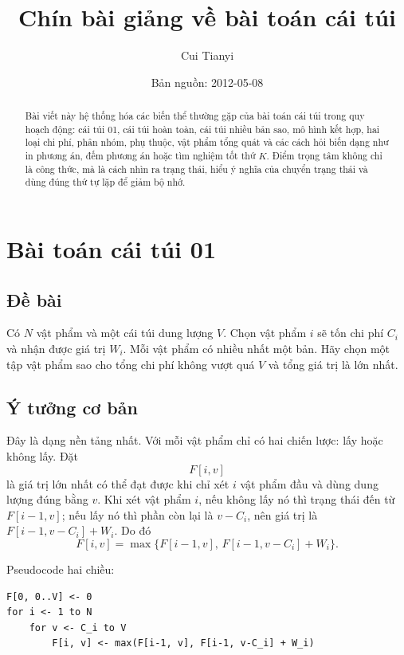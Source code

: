 \documentclass[11pt]{article}
\title{Chín bài giảng về bài toán cái túi}
\author{Cui Tianyi}
\date{Bản nguồn: 2012-05-08}
\begin{document}
\maketitle


\begin{abstract}
Bài viết này hệ thống hóa các biến thể thường gặp của bài toán cái túi trong
quy hoạch động: cái túi 01, cái túi hoàn toàn, cái túi nhiều bản sao, mô hình
kết hợp, hai loại chi phí, phân nhóm, phụ thuộc, vật phẩm tổng quát và các
cách hỏi biến dạng như in phương án, đếm phương án hoặc tìm nghiệm tốt thứ
\(K\). Điểm trọng tâm không chỉ là công thức, mà là cách nhìn ra trạng thái,
hiểu ý nghĩa của chuyển trạng thái và dùng đúng thứ tự lặp để giảm bộ nhớ.
\end{abstract}

\tableofcontents

\section{Bài toán cái túi 01}

\subsection{Đề bài}

Có \(N\) vật phẩm và một cái túi dung lượng \(V\). Chọn vật phẩm \(i\) sẽ tốn
chi phí \(C_i\) và nhận được giá trị \(W_i\). Mỗi vật phẩm có nhiều nhất một
bản. Hãy chọn một tập vật phẩm sao cho tổng chi phí không vượt quá \(V\) và
tổng giá trị là lớn nhất.

\subsection{Ý tưởng cơ bản}

Đây là dạng nền tảng nhất. Với mỗi vật phẩm chỉ có hai chiến lược: lấy hoặc
không lấy. Đặt
\[
  F[i,v]
\]
là giá trị lớn nhất có thể đạt được khi chỉ xét \(i\) vật phẩm đầu và dùng
dung lượng đúng bằng \(v\). Khi xét vật phẩm \(i\), nếu không lấy nó thì trạng
thái đến từ \(F[i-1,v]\); nếu lấy nó thì phần còn lại là \(v-C_i\), nên giá
trị là \(F[i-1,v-C_i]+W_i\). Do đó
\[
  F[i,v]=\max\{F[i-1,v],\,F[i-1,v-C_i]+W_i\}.
\]

Pseudocode hai chiều:
\begin{verbatim}
F[0, 0..V] <- 0
for i <- 1 to N
    for v <- C_i to V
        F[i, v] <- max(F[i-1, v], F[i-1, v-C_i] + W_i)
\end{verbatim}
\end{document}
